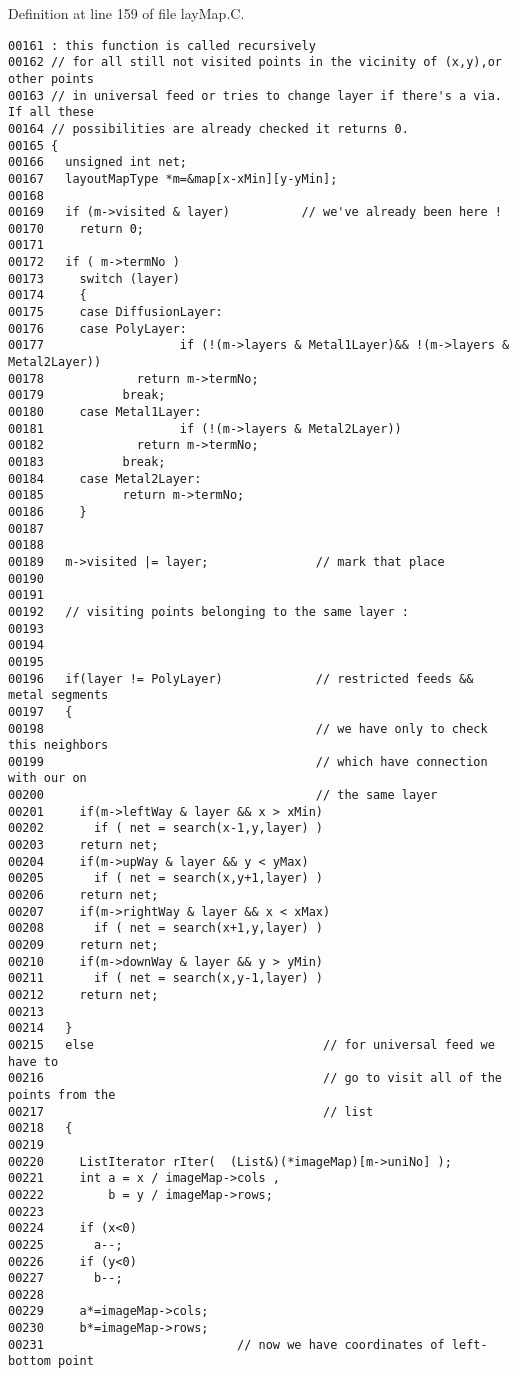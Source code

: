 Definition at line 159 of file lay\-Map.C.\small\begin{verbatim}00161 : this function is called recursively
00162 // for all still not visited points in the vicinity of (x,y),or other points
00163 // in universal feed or tries to change layer if there's a via. If all these
00164 // possibilities are already checked it returns 0.
00165 {
00166   unsigned int net;
00167   layoutMapType *m=&map[x-xMin][y-yMin];
00168 
00169   if (m->visited & layer)          // we've already been here !
00170     return 0;            
00171 
00172   if ( m->termNo )
00173     switch (layer)
00174     {
00175     case DiffusionLayer:
00176     case PolyLayer:
00177                   if (!(m->layers & Metal1Layer)&& !(m->layers & Metal2Layer))
00178             return m->termNo;
00179           break;
00180     case Metal1Layer:
00181                   if (!(m->layers & Metal2Layer))
00182             return m->termNo;
00183           break;
00184     case Metal2Layer:
00185           return m->termNo;
00186     }
00187 
00188 
00189   m->visited |= layer;               // mark that place
00190   
00191 
00192   // visiting points belonging to the same layer :
00193 
00194 
00195 
00196   if(layer != PolyLayer)             // restricted feeds && metal segments
00197   {
00198                                      // we have only to check this neighbors
00199                                      // which have connection with our on
00200                                      // the same layer
00201     if(m->leftWay & layer && x > xMin)
00202       if ( net = search(x-1,y,layer) )
00203     return net;
00204     if(m->upWay & layer && y < yMax)
00205       if ( net = search(x,y+1,layer) )
00206     return net;
00207     if(m->rightWay & layer && x < xMax)
00208       if ( net = search(x+1,y,layer) )
00209     return net;
00210     if(m->downWay & layer && y > yMin)
00211       if ( net = search(x,y-1,layer) )
00212     return net;
00213     
00214   }
00215   else                                // for universal feed we have to
00216                                       // go to visit all of the points from the 
00217                                       // list
00218   {
00219 
00220     ListIterator rIter(  (List&)(*imageMap)[m->uniNo] );
00221     int a = x / imageMap->cols ,
00222         b = y / imageMap->rows;
00223     
00224     if (x<0)
00225       a--;
00226     if (y<0)
00227       b--;
00228 
00229     a*=imageMap->cols;
00230     b*=imageMap->rows;
00231                           // now we have coordinates of left-bottom point

\end{verbatim}
